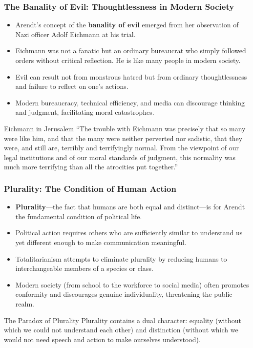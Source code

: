 \documentclass{beamer}
\begin{document}
\begin{frame}
\frametitle{The Banality of Evil: Thoughtlessness in Modern Society}
\begin{itemize}
    \item Arendt's concept of the \textbf{banality of evil} emerged from her observation of Nazi officer Adolf Eichmann at his trial.
    \item Eichmann was not a fanatic but an ordinary bureaucrat who simply followed orders without critical reflection. He is like many people in modern society.
    \item Evil can result not from monstrous hatred but from ordinary thoughtlessness and failure to reflect on one's actions.
    \item Modern bureaucracy, technical efficiency, and media can discourage thinking and judgment, facilitating moral catastrophes.
\end{itemize}

\begin{exampleblock}{Eichmann in Jerusalem}
    \scriptsize
``The trouble with Eichmann was precisely that so many were like him, and that the many were neither perverted nor sadistic, that they were, and still are, terribly and terrifyingly normal. From the viewpoint of our legal institutions and of our moral standards of judgment, this normality was much more terrifying than all the atrocities put together.''
\end{exampleblock}
\end{frame}

\begin{frame}
\frametitle{Plurality: The Condition of Human Action}
\begin{itemize}
    \item \textbf{Plurality}—the fact that humans are both equal and distinct—is for Arendt the fundamental condition of political life.
    \item Political action requires others who are sufficiently similar to understand us yet different enough to make communication meaningful.
    \item Totalitarianism attempts to eliminate plurality by reducing humans to interchangeable members of a species or class.
    \item Modern society (from school to the workforce to social media) often promotes conformity and discourages genuine individuality, threatening the public realm.
\end{itemize}

\begin{block}{The Paradox of Plurality}
Plurality contains a dual character: equality (without which we could not understand each other) and distinction (without which we would not need speech and action to make ourselves understood).
\end{block}
\end{frame}
\end{document}
